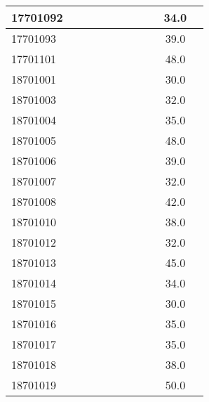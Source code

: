 \documentclass[12pt]{article}
\begin{document}
\begin{center}
\begin{small}
\begin{tabular}{|l|c|c|c|c|c|c|c|c|c|c|}
17701092 &  &  &  &  &  &  &  &  & 34.0\\ \hline 
17701093 &  &  &  &  &  &  &  &  & 39.0\\ \hline 
17701101 &  &  &  &  &  &  &  &  & 48.0\\ \hline 
18701001 &  &  &  &  &  &  &  &  & 30.0\\ \hline 
18701003 &  &  &  &  &  &  &  &  & 32.0\\ \hline 
18701004 &  &  &  &  &  &  &  &  & 35.0\\ \hline 
18701005 &  &  &  &  &  &  &  &  & 48.0\\ \hline 
18701006 &  &  &  &  &  &  &  &  & 39.0\\ \hline 
18701007 &  &  &  &  &  &  &  &  & 32.0\\ \hline 
18701008 &  &  &  &  &  &  &  &  & 42.0\\ \hline 
18701010 &  &  &  &  &  &  &  &  & 38.0\\ \hline 
18701012 &  &  &  &  &  &  &  &  & 32.0\\ \hline 
18701013 &  &  &  &  &  &  &  &  & 45.0\\ \hline 
18701014 &  &  &  &  &  &  &  &  & 34.0\\ \hline 
18701015 &  &  &  &  &  &  &  &  & 30.0\\ \hline 
18701016 &  &  &  &  &  &  &  &  & 35.0\\ \hline 
18701017 &  &  &  &  &  &  &  &  & 35.0\\ \hline 
18701018 &  &  &  &  &  &  &  &  & 38.0\\ \hline 
18701019 &  &  &  &  &  &  &  &  & 50.0\\ \hline 
        \end{tabular}
            \end{small}
            \end{center}
  \centering
            
\end{document}
